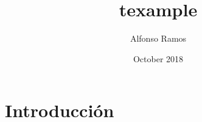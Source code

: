 \documentclass{article}
\title{texample}
\author{Alfonso Ramos}
\date{October 2018}
\begin{document}
\maketitle

\section{Introducción}
\lipsum[1-5]
\end{document}

